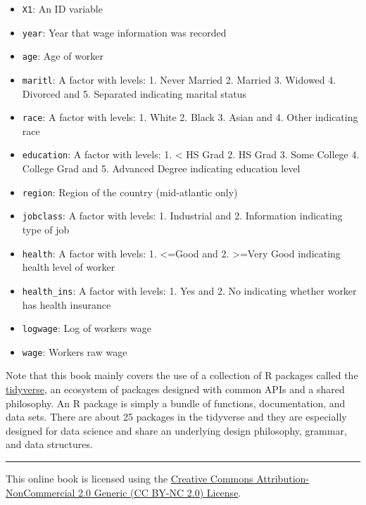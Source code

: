 \documentclass[
]{book}
\providecommand{\tightlist}{%
  \setlength{\itemsep}{0pt}\setlength{\parskip}{0pt}}
\begin{document}
\begin{itemize}
\tightlist
\item
  \texttt{X1}: An ID variable
\item
  \texttt{year}: Year that wage information was recorded
\item
  \texttt{age}: Age of worker
\item
  \texttt{maritl}: A factor with levels: 1. Never Married 2. Married 3. Widowed 4. Divorced and 5. Separated indicating marital status
\item
  \texttt{race}: A factor with levels: 1. White 2. Black 3. Asian and 4. Other indicating race
\item
  \texttt{education}: A factor with levels: 1. \textless{} HS Grad 2. HS Grad 3. Some College 4. College Grad and 5. Advanced Degree indicating education level
\item
  \texttt{region}: Region of the country (mid-atlantic only)
\item
  \texttt{jobclass}: A factor with levels: 1. Industrial and 2. Information indicating type of job
\item
  \texttt{health}: A factor with levels: 1. \textless=Good and 2. \textgreater=Very Good indicating health level of worker
\item
  \texttt{health\_ins}: A factor with levels: 1. Yes and 2. No indicating whether worker has health insurance
\item
  \texttt{logwage}: Log of workers wage
\item
  \texttt{wage}: Workers raw wage
\end{itemize}

Note that this book mainly covers the use of a collection of R packages called the \href{https://www.tidyverse.org}{tidyverse}, an ecosystem of packages designed with common APIs and a shared philosophy. An R package is simply a bundle of functions, documentation, and data sets. There are about 25 packages in the tidyverse and they are especially designed for data science and share an underlying design philosophy, grammar, and data structures.

\begin{center}\rule{0.5\linewidth}{0.5pt}\end{center}

This online book is licensed using the \href{https://creativecommons.org/licenses/by-nc/2.0/}{Creative Commons Attribution-NonCommercial 2.0 Generic (CC BY-NC 2.0) License}.

\hfill\break
\end{document}
